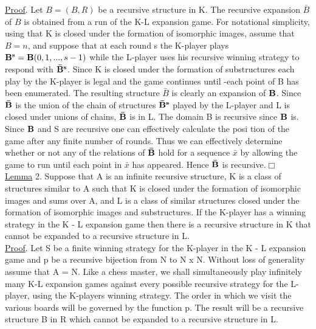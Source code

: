 \documentclass[twoside]{article}
\begin{document}
\newline
\underline{Proof}.     Let $B = (B,R)$ be a recursive structure in   K.   The recursive expansion   $\bar{B}$ of $B$ is obtained from a run of the K-L expansion game. 
For notational simplicity, using that K is closed under the formation of isomorphic images, assume that   $B = n$, and suppose that at each round   s   the K-player plays   $\mathbf{B^s} = \mathbf{B}(0,1,...,s-1)$   while the   L-player uses his recursive winning strategy to respond with  $\mathbf{\bar{B}^s}$.   
Since   K   is closed under the formation of substructures each play by the   K-player is legal and the game continues until -each point of   B   has been enumerated.   
The resulting structure   $\bar{B}$   is clearly
\newpage
%
%
\noindent an expansion of $\mathbf{B}$. 
Since $\mathbf{\bar{B}}$ is the union of the chain of structures $\mathbf{\bar{B}^s}$ played by the L-player and L is closed under unions of chains, $\mathbf{\bar{B}}$ is in L. 
The domain B is recursive since $\mathbf{B}$ is. 
Since $\mathbf{B}$ and S are recursive one can effectively calculate the posi tion of the game after any finite number of rounds. Thus we can effectively determine whether or not any of the relations of $\mathbf{\bar{B}}$ hold for a sequence $\bar{x}$ by allowing the game to run until each point in $\bar{x}$   has appeared.    
Hence   $\mathbf{\bar{B}}$  is recursive.$\Box$\\
\newline
\underline{Lemma} 2.    Suppose that A   is an infinite recursive structure, K   is a class of structures similar to   A   such that   K   is closed under the formation of isomorphic images and sums over A, and   L   is a class of similar structures closed under the formation of isomorphic images and substructures.
If the K-player has a winning strategy in the   K - L   expansion game then there is a recursive structure in   K   that cannot be expanded to a recursive structure in L.\\
\newline
\underline{Proof}.    Let   S   be a finite winning strategy for the   K-player in the   K - L expansion game and   p   be a recursive bijection from N   to N x N. Without loss of generality assume that   A =   N.    
Like a chess master, we shall simultaneously play infinitely many K-L expansion games against every possible recursive strategy for the L-player, using the K-players winning strategy. 
The order in which we visit the various boards will be governed by the function p. The result will be a recursive structure B in R which cannot be expanded to a recursive structure in L.
\end{document}
